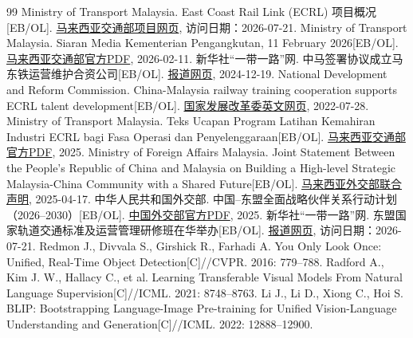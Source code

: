 \documentclass[UTF8,a4paper,zihao=-4]{ctexart}
\begin{document}
\clearpage
{}
{}
\begin{thebibliography}{99}
 Ministry of Transport Malaysia. East Coast Rail Link (ECRL) 项目概况[EB/OL]. \href{https://www.mot.gov.my/my/land/development/ongoing-rail-project}{马来西亚交通部项目网页}, 访问日期：2026-07-21.
 Ministry of Transport Malaysia. Siaran Media Kementerian Pengangkutan, 11 February 2026[EB/OL]. \href{https://www.mot.gov.my/en/Kenyataan\%20Media/Year\%202026/SIARAN\%20MEDIA\%20KEMENTERIAN\%20PENGANGKUTAN\%20\%28110226\%29\%20\%28v4\%29.pdf}{马来西亚交通部官方PDF}, 2026-02-11.
 新华社“一带一路”网. 中马签署协议成立马东铁运营维护合资公司[EB/OL]. \href{https://www.yidaiyilu.gov.cn/p/0P55S56C.html}{报道网页}, 2024-12-19.
 National Development and Reform Commission. China-Malaysia railway training cooperation supports ECRL talent development[EB/OL]. \href{https://en.ndrc.gov.cn/netcoo/achievements/202207/t20220728_1332745.html}{国家发展改革委英文网页}, 2022-07-28.
 Ministry of Transport Malaysia. Teks Ucapan Program Latihan Kemahiran Industri ECRL bagi Fasa Operasi dan Penyelenggaraan[EB/OL]. \href{https://www.mot.gov.my/my/Ucapan\%20YBM/Tahun\%202025/Teks\%20Ucapan\%20YB\%20MOT\%20-\%20PLKI-ECRL\%20O\%26M.pdf}{马来西亚交通部官方PDF}, 2025.
 Ministry of Foreign Affairs Malaysia. Joint Statement Between the People's Republic of China and Malaysia on Building a High-level Strategic Malaysia-China Community with a Shared Future[EB/OL]. \href{https://www.kln.gov.my/web/guest/-/joint-statement-between-the-people-s-republic-of-china-and-malaysia-on-building-a-high-level-strategic-malaysia-china-community-with-a-shared-future-1}{马来西亚外交部联合声明}, 2025-04-17.
 中华人民共和国外交部. 中国--东盟全面战略伙伴关系行动计划（2026--2030）[EB/OL]. \href{https://www.mfa.gov.cn/wjbzhd/202508/P020250829826265881620.pdf}{中国外交部官方PDF}, 2025.
 新华社“一带一路”网. 东盟国家轨道交通标准及运营管理研修班在华举办[EB/OL]. \href{https://www.yidaiyilu.gov.cn/p/05CAJT2H.html}{报道网页}, 访问日期：2026-07-21.
 Redmon J., Divvala S., Girshick R., Farhadi A. You Only Look Once: Unified, Real-Time Object Detection[C]//CVPR. 2016: 779--788.
 Radford A., Kim J. W., Hallacy C., et al. Learning Transferable Visual Models From Natural Language Supervision[C]//ICML. 2021: 8748--8763.
 Li J., Li D., Xiong C., Hoi S. BLIP: Bootstrapping Language-Image Pre-training for Unified Vision-Language Understanding and Generation[C]//ICML. 2022: 12888--12900.

\end{thebibliography}
\end{document}
